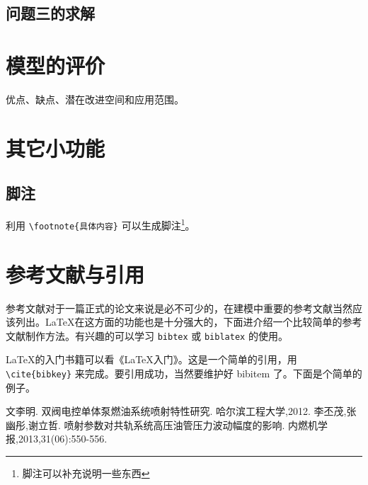 \documentclass{cumcmthesis}
\begin{document}
\subsection{问题三的求解}
\newpage
\section{模型的评价}
优点、缺点、潜在改进空间和应用范围。

\newpage

\section{其它小功能}
\subsection{脚注}

利用 \verb|\footnote{具体内容}| 可以生成脚注\footnote{脚注可以补充说明一些东西}。









\section{参考文献与引用}

参考文献对于一篇正式的论文来说是必不可少的，在建模中重要的参考文献当然应该列出。\LaTeX{}在这方面的功能也是十分强大的，下面进介绍一个比较简单的参考文献制作方法。有兴趣的可以学习 \verb|bibtex| 或 \verb|biblatex| 的使用。

\LaTeX{}的入门书籍可以看《\LaTeX{}入门》\cite{liuhaiyang2013latex}。这是一个简单的引用，用 \verb|\cite{bibkey}| 来完成。要引用成功，当然要维护好 bibitem 了。下面是个简单的例子。

\newpage

\begin{thebibliography}{9}%
    文李明.
    \newblock 双阀电控单体泵燃油系统喷射特性研究\allowbreak[D].
    \newblock 哈尔滨工程大学,2012.
    \bibitem[2]
    李丕茂,张幽彤,谢立哲.
    \newblock 喷射参数对共轨系统高压油管压力波动幅度的影响\allowbreak[J].
    \newblock 内燃机学报,2013,31(06):550-556.
\end{thebibliography}
\end{document}
